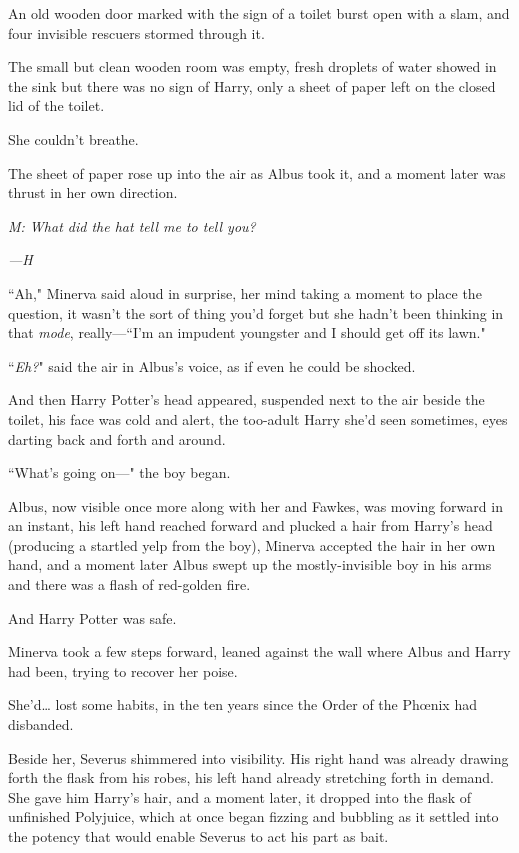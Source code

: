 An old wooden door marked with the sign of a toilet burst open with a slam, and four invisible rescuers stormed through it.

The small but clean wooden room was empty, fresh droplets of water showed in the sink but there was no sign of Harry, only a sheet of paper left on the closed lid of the toilet.

She couldn't breathe.

The sheet of paper rose up into the air as Albus took it, and a moment later was thrust in her own direction.

\emph{M: What did the hat tell me to tell you?}

\emph{---H}

``Ah," Minerva said aloud in surprise, her mind taking a moment to place the question, it wasn't the sort of thing you'd forget but she hadn't been thinking in that \emph{mode}, really---``I'm an impudent youngster and I should get off its lawn."

``\emph{Eh?}" said the air in Albus's voice, as if even he could be shocked.

And then Harry Potter's head appeared, suspended next to the air beside the toilet, his face was cold and alert, the too-adult Harry she'd seen sometimes, eyes darting back and forth and around.

``What's going on---" the boy began.

Albus, now visible once more along with her and Fawkes, was moving forward in an instant, his left hand reached forward and plucked a hair from Harry's head (producing a startled yelp from the boy), Minerva accepted the hair in her own hand, and a moment later Albus swept up the mostly-invisible boy in his arms and there was a flash of red-golden fire.

And Harry Potter was safe.

Minerva took a few steps forward, leaned against the wall where Albus and Harry had been, trying to recover her poise.

She'd{\ldots} lost some habits, in the ten years since the Order of the Phœnix had disbanded.

Beside her, Severus shimmered into visibility. His right hand was already drawing forth the flask from his robes, his left hand already stretching forth in demand. She gave him Harry's hair, and a moment later, it dropped into the flask of unfinished Polyjuice, which at once began fizzing and bubbling as it settled into the potency that would enable Severus to act his part as bait.

